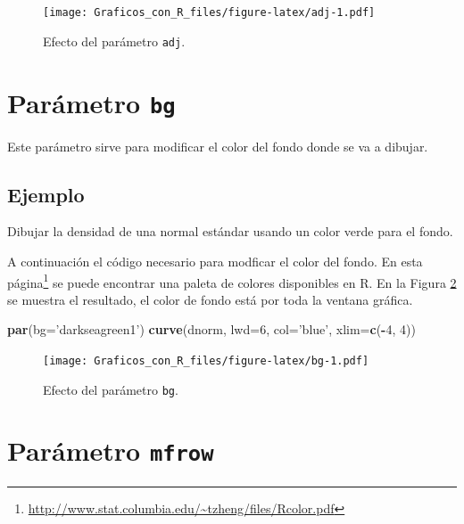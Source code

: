 \documentclass[10pt,]{krantz}
\makeatletter
\newenvironment{Shaded}{\begin{snugshade}}{\end{snugshade}}
\newcommand{\KeywordTok}[1]{\textcolor[rgb]{0.13,0.29,0.53}{\textbf{#1}}}
\newcommand{\DataTypeTok}[1]{\textcolor[rgb]{0.13,0.29,0.53}{#1}}
\newcommand{\DecValTok}[1]{\textcolor[rgb]{0.00,0.00,0.81}{#1}}
\newcommand{\StringTok}[1]{\textcolor[rgb]{0.31,0.60,0.02}{#1}}
\newcommand{\OperatorTok}[1]{\textcolor[rgb]{0.81,0.36,0.00}{\textbf{#1}}}
\newcommand{\NormalTok}[1]{#1}
\let\proglang=\textsf
\renewcommand{\href}[2]{#2\footnote{\url{#1}}}
\newenvironment{kframe}{%
\medskip{}
\setlength{\fboxsep}{.8em}
 \def\at@end@of@kframe{}%
 \ifinner\ifhmode%
  \def\at@end@of@kframe{\end{minipage}}%
  \begin{minipage}{\columnwidth}%
 \fi\fi%
 \def\FrameCommand##1{\hskip\@totalleftmargin \hskip-\fboxsep
 \colorbox{shadecolor}{##1}\hskip-\fboxsep
     \hskip-\linewidth \hskip-\@totalleftmargin \hskip\columnwidth}%
 \MakeFramed {\advance\hsize-\width
   \@totalleftmargin\z@ \linewidth\hsize
   \@setminipage}}%
 {\par\unskip\endMakeFramed%
 \at@end@of@kframe}
\renewenvironment{Shaded}{\begin{kframe}}{\end{kframe}}
\makeatother
\begin{document}
\begin{figure}
\centering
\texttt{[image: Graficos\_con\_R\_files/figure-latex/adj-1.pdf]}
\caption{\label{fig:adj}Efecto del parámetro \texttt{adj}.}
\end{figure}

\section{\texorpdfstring{Parámetro \texttt{bg} 
}{Parámetro bg  }}\label{parametro-bg}

Este parámetro sirve para modificar el color del fondo donde se va a
dibujar.

\subsection*{Ejemplo}\label{ejemplo-35}


Dibujar la densidad de una normal estándar usando un color verde para el
fondo.

A continuación el código necesario para modficar el color del fondo. En
esta
\href{http://www.stat.columbia.edu/~tzheng/files/Rcolor.pdf}{página} se
puede encontrar una paleta de colores disponibles en \proglang{R}. En la
Figura \ref{fig:bg} se muestra el resultado, el color de fondo está por
toda la ventana gráfica.

\begin{Shaded}
\begin{Highlighting}[]
\KeywordTok{par}\NormalTok{(}\DataTypeTok{bg=}\StringTok{'darkseagreen1'}\NormalTok{)}
\KeywordTok{curve}\NormalTok{(dnorm, }\DataTypeTok{lwd=}\DecValTok{6}\NormalTok{, }\DataTypeTok{col=}\StringTok{'blue'}\NormalTok{, }\DataTypeTok{xlim=}\KeywordTok{c}\NormalTok{(}\OperatorTok{-}\DecValTok{4}\NormalTok{, }\DecValTok{4}\NormalTok{))}
\end{Highlighting}
\end{Shaded}

\begin{figure}
\centering
\texttt{[image: Graficos\_con\_R\_files/figure-latex/bg-1.pdf]}
\caption{\label{fig:bg}Efecto del parámetro \texttt{bg}.}
\end{figure}

\section{\texorpdfstring{Parámetro \texttt{mfrow}
}{Parámetro mfrow  }}\label{parametro-mfrow}
\end{document}
